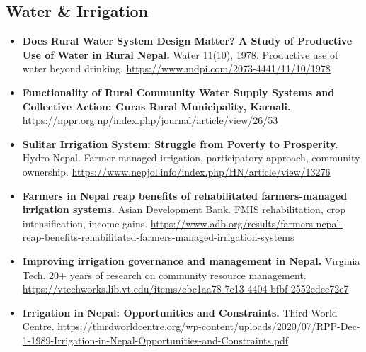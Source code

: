 \documentclass[11pt,a4paper]{article}
\begin{document}
\subsection{Water \& Irrigation}
\begin{itemize}
    \item \textbf{Does Rural Water System Design Matter? A Study of Productive Use of Water in Rural Nepal.} Water 11(10), 1978. Productive use of water beyond drinking. \url{https://www.mdpi.com/2073-4441/11/10/1978}
    \item \textbf{Functionality of Rural Community Water Supply Systems and Collective Action: Guras Rural Municipality, Karnali.} \url{https://nppr.org.np/index.php/journal/article/view/26/53}
    \item \textbf{Sulitar Irrigation System: Struggle from Poverty to Prosperity.} Hydro Nepal. Farmer-managed irrigation, participatory approach, community ownership. \url{https://www.nepjol.info/index.php/HN/article/view/13276}
    \item \textbf{Farmers in Nepal reap benefits of rehabilitated farmers-managed irrigation systems.} Asian Development Bank. FMIS rehabilitation, crop intensification, income gains. \url{https://www.adb.org/results/farmers-nepal-reap-benefits-rehabilitated-farmers-managed-irrigation-systems}
    \item \textbf{Improving irrigation governance and management in Nepal.} Virginia Tech. 20+ years of research on community resource management. \url{https://vtechworks.lib.vt.edu/items/cbc1aa78-7c13-4404-bfbf-2552edcc72e7}
    \item \textbf{Irrigation in Nepal: Opportunities and Constraints.} Third World Centre. \url{https://thirdworldcentre.org/wp-content/uploads/2020/07/RPP-Dec-1-1989-Irrigation-in-Nepal-Opportunities-and-Constraints.pdf}
\end{itemize}
\end{document}
